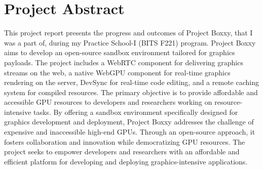 
\chapter{Project Abstract} %

\label{Chapter0} %


This project report presents the progress and outcomes of Project Boxxy, that I was a part of, during my Practice School-I (BITS F221) program.
Project Boxxy aims to develop an open-source sandbox environment tailored for graphics payloads.
The project includes a WebRTC component for delivering graphics streams on the web, a native WebGPU component for real-time graphics rendering on the server, DevSync for real-time code editing, and a remote caching system for compiled resources.
The primary objective is to provide affordable and accessible GPU resources to developers and researchers working on resource-intensive tasks. By offering a sandbox environment specifically designed for graphics development and deployment, Project Boxxy addresses the challenge of expensive and inaccessible high-end GPUs.
Through an open-source approach, it fosters collaboration and innovation while democratizing GPU resources. The project seeks to empower developers and researchers with an affordable and efficient platform for developing and deploying graphics-intensive applications.